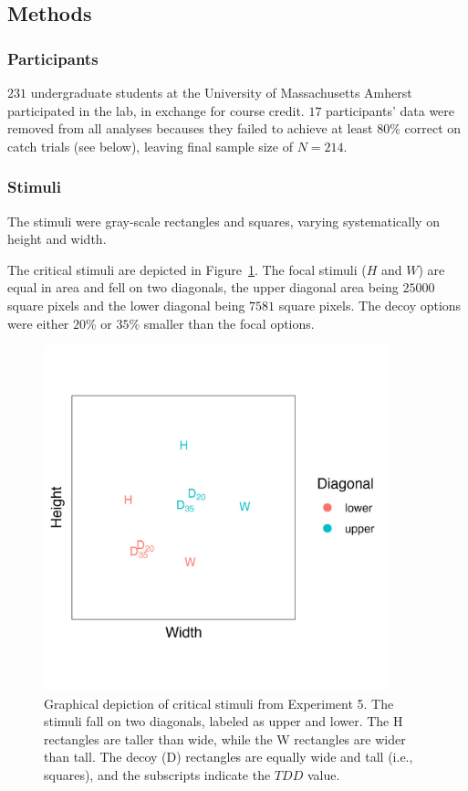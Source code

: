 \subsection{Methods}

\subsubsection{Participants}
$231$ undergraduate students at the University of Massachusetts Amherst participated in the lab, in exchange for course credit. $17$ participants' data were removed from all analyses becauses they failed to achieve at least $80\%$ correct on catch trials (see below), leaving final sample size of $N=214$. 

\subsubsection{Stimuli}
The stimuli were gray-scale rectangles and squares, varying systematically on height and width. 

The critical stimuli are depicted in Figure~\ref{fig:comparability_stim_plot}. The focal stimuli ($H$ and $W$) are equal in area and fell on two diagonals, the upper diagonal area being $25000$ square pixels and the lower diagonal being $7581$ square pixels. The decoy options were either $20\%$ or $35\%$ smaller than the focal options.

\begin{figure}
   \includegraphics[width=100mm]{figures/comparability_stim.jpg}
   \caption{Graphical depiction of critical stimuli from Experiment 5. The stimuli fall on two diagonals, labeled as upper and lower. The H rectangles are taller than wide, while the W rectangles are wider than tall. The decoy (D) rectangles are equally wide and tall (i.e., squares), and the subscripts indicate the $TDD$ value.}
   \label{fig:comparability_stim_plot}
\end{figure}

